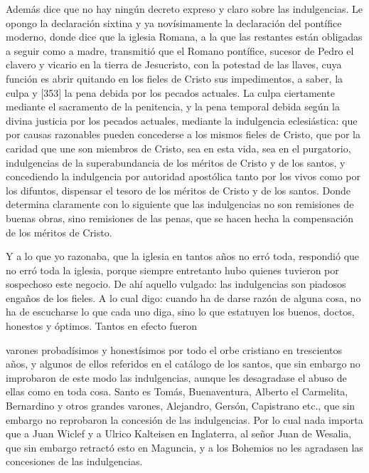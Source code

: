 Además dice que no hay ningún decreto expreso y claro sobre las indulgencias. Le opongo la declaración sixtina y ya novísimamente la declaración del pontífice moderno, donde dice que la iglesia Romana, a la que las restantes están obligadas a seguir como a madre, transmitió que el Romano pontífice, sucesor de Pedro el clavero y vicario en la tierra de Jesucristo, con la potestad de las llaves, cuya función es abrir quitando en los fieles de Cristo sus impedimentos, a saber, la culpa y [353] la pena debida por los pecados actuales. La culpa ciertamente mediante el sacramento de la penitencia, y la pena temporal debida según la divina justicia por los pecados actuales, mediante la indulgencia eclesiástica: que por causas razonables pueden concederse a los mismos fieles de Cristo, que por la caridad que une son miembros de Cristo, sea en esta vida, sea en el purgatorio, indulgencias de la superabundancia de los méritos de Cristo y de los santos, y concediendo la indulgencia por autoridad apostólica tanto por los vivos como por los difuntos, dispensar el tesoro de los méritos de Cristo y de los santos. Donde determina claramente con lo siguiente que las indulgencias no son remisiones de buenas obras, sino remisiones de las penas, que se hacen hecha la compensación de los méritos de Cristo.

Y a lo que yo razonaba, que la iglesia en tantos años no erró toda, respondió que no erró toda la iglesia, porque siempre entretanto hubo quienes tuvieron por sospechoso este negocio. De ahí aquello vulgado: las indulgencias son piadosos engaños de los fieles. A lo cual digo: cuando ha de darse razón de alguna cosa, no ha de escucharse lo que cada uno diga, sino lo que estatuyen los buenos, doctos, honestos y óptimos. Tantos en efecto fueron

varones probadísimos y honestísimos por todo el orbe cristiano en trescientos años, y algunos de ellos referidos en el catálogo de los santos, que sin embargo no improbaron de este modo las indulgencias, aunque les desagradase el abuso de ellas como en toda cosa. Santo es Tomás, Buenaventura, Alberto el Carmelita, Bernardino y otros grandes varones, Alejandro, Gersón, Capistrano etc., que sin embargo no reprobaron la concesión de las indulgencias. Por lo cual nada importa que a Juan Wiclef y a Ulrico Kalteisen en Inglaterra, al señor Juan de Wesalia, que sin embargo retractó esto en Maguncia, y a los Bohemios no les agradasen las concesiones de las indulgencias.

